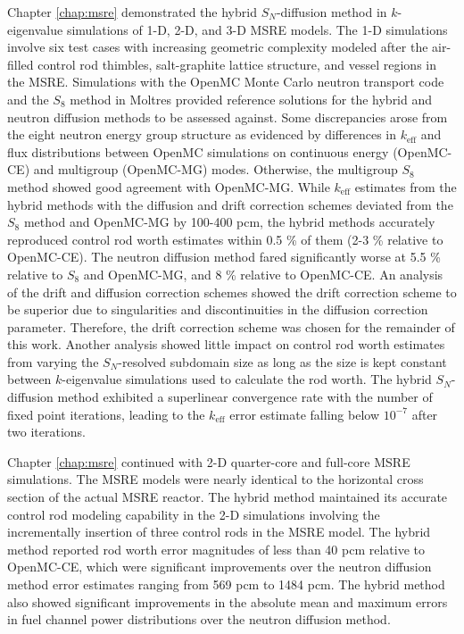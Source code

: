 Chapter \ref{chap:msre} demonstrated the hybrid $S_N$-diffusion method in $k$-eigenvalue simulations
of 1-D, 2-D, and 3-D \gls{MSRE} models. The 1-D simulations involve six test cases with increasing
geometric complexity modeled after the air-filled control rod thimbles, salt-graphite lattice
structure, and vessel regions in the \gls{MSRE}. Simulations with the OpenMC Monte Carlo neutron
transport code and the $S_8$ method in Moltres provided reference solutions for the hybrid and
neutron diffusion methods to be assessed against. Some discrepancies arose from the eight neutron
energy group structure as evidenced by differences in $k_\text{eff}$ and flux distributions between
OpenMC simulations on continuous energy (OpenMC-CE) and multigroup (OpenMC-MG) modes. Otherwise, the
multigroup $S_8$ method showed good agreement with OpenMC-MG. While $k_\text{eff}$ estimates from
the hybrid methods with the diffusion and drift correction schemes deviated from the $S_8$ method
and OpenMC-MG by 100-400 pcm, the hybrid methods
accurately reproduced control rod worth estimates within 0.5 \% of them (2-3 \% relative to
OpenMC-CE). The neutron diffusion method fared significantly worse at 5.5 \% relative to $S_8$ and
OpenMC-MG, and 8 \% relative to OpenMC-CE. An analysis of the drift and diffusion correction
schemes showed the drift correction scheme to be superior due to singularities and discontinuities
in the diffusion correction parameter. Therefore, the drift correction scheme was chosen for
the remainder of this work. Another analysis showed little impact on control rod worth estimates
from varying the $S_N$-resolved subdomain size as long as the size is kept constant between
$k$-eigenvalue simulations used to calculate the rod worth. The hybrid $S_N$-diffusion method
exhibited a superlinear convergence rate with the number of fixed point iterations, leading to the
$k_\text{eff}$ error estimate falling below $10^{-7}$ after two iterations.

Chapter \ref{chap:msre} continued with 2-D quarter-core and full-core \gls{MSRE} simulations. The
\gls{MSRE} models were nearly identical to the horizontal cross section of the actual \gls{MSRE}
reactor. The hybrid method maintained its accurate control rod modeling capability in the 2-D
simulations involving the incrementally insertion of three control rods in the \gls{MSRE} model.
The hybrid method reported rod worth error magnitudes of less than 40 pcm relative to OpenMC-CE,
which were significant improvements over the neutron diffusion method error estimates ranging from
569 pcm to 1484 pcm. The hybrid method also showed significant improvements in the absolute mean
and maximum errors in fuel channel power distributions over the neutron diffusion method.

